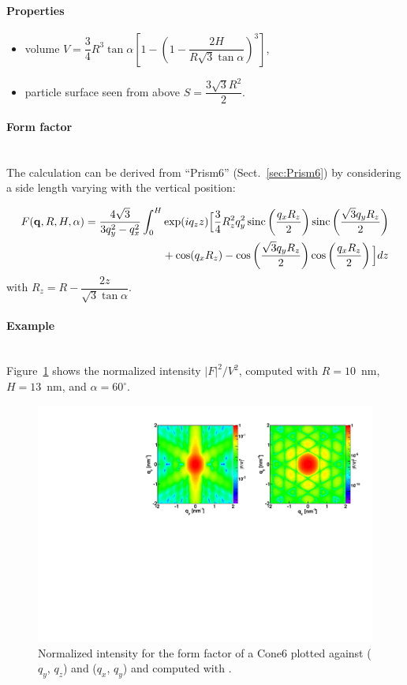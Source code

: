 \paragraph{Properties}
\begin{itemize}
\item volume $V = \dfrac{3}{4} R^3 \tan\alpha  \left[
            1 - \left(1- \dfrac{2H}{ R\sqrt{3}\tan\alpha}\right)^3
            \right]$,
\item  particle surface seen from above $S =\dfrac{3\sqrt{3}R^2}{2}$.
\end{itemize}

\paragraph{Form factor}\strut\\
The calculation can be derived from ``Prism6'' (Sect.~\ref{sec:Prism6}) by
considering a side length varying with the vertical position:

\begin{align*}
F(\mathbf{q}, R, H, \alpha) = \frac{4\sqrt{3}}{3q_y ^2 - q_x^2}\int_0 ^H &\exp(iq_z z)
\Big[\frac{3}{4}R_z^2q_y^2 \operatorname{sinc}\left(\frac{q_xR_z}{2}\right)\operatorname{sinc}\left(\frac{\sqrt{3}q_y
R_z}{2}\right)\\
&+\cos(q_xR_z)-\cos\left(\frac{\sqrt{3}q_y R_z}{2}\right)\cos\left(\frac{q_xR_z}{2}\right) \Big]dz
\end{align*}
with $R_z=R-\dfrac{2z}{\sqrt{3}\tan\alpha}$.


\paragraph{Example}\strut\\
Figure~\ref{fig:FFCone6Ex} shows the normalized intensity
$|F|^2/V^2$, computed with $R=10$~nm, $H=13$~nm, and
$\alpha=60^{\circ}$.

\begin{figure}[h]
\begin{center}
\includegraphics[angle=-90,width=\textwidth]{fig/ff/figffcone6.pdf}
\end{center}
\caption{Normalized intensity for the form factor of a Cone6 plotted against ($q_y$, $q_z$) and ($q_x$, $q_y$) and computed with .}
\label{fig:FFCone6Ex}
\end{figure}

